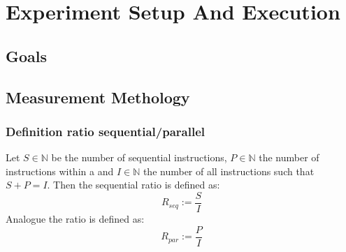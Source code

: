 \chapter{Experiment Setup And Execution}
\section{Goals}

\section{Measurement Methology}
\subsection{Definition ratio sequential/parallel}
Let \(S\in\mathbb{N}\) be the number of sequential instructions, \(P\in\mathbb{N}\) the number of instructions within a \scop and \(I\in\mathbb{N}\) the number of all instructions such that \(S + P = I\).
Then the sequential ratio is defined as:
\[R_{seq} := \frac{S}{I}\]
Analogue the \scop ratio is defined as:
\[R_{par} := \frac{P}{I}\]
